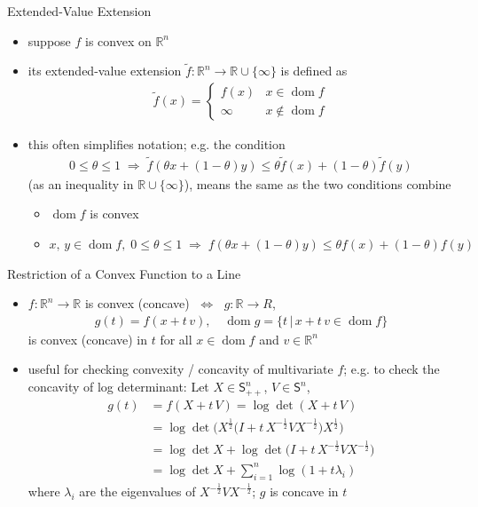 \documentclass[10pt,handout]{beamer}
\newcommand{\ds}{\displaystyle}
\newcommand{\ie}{\;\Longrightarrow\;}
\newcommand{\ifff}{\;\Longleftrightarrow\;}
\DeclareMathOperator*{\dom}{dom}
\theoremstyle{definition}
\begin{document}
\begin{frame}{Extended-Value Extension}
  \begin{itemize}
    \item suppose $f$ is convex on $\mathbb{R}^n$
    \item its extended-value extension $\ds\widetilde{f}: \mathbb{R}^n\to\mathbb{R}\cup\{\infty\}$ is defined as
      \begin{align*}
        \widetilde{f}(x) = \begin{cases}f(x) & x\in\dom f \\ \infty & x\not\in\dom f\end{cases} 
      \end{align*}
    \item this often simplifies notation; e.g. the condition 
      \begin{align*}
        0\leqslant\theta\leqslant 1\ie\widetilde{f}(\theta x + (1 - \theta) y)\leqslant\theta\widetilde{f}(x) + (1 - \theta)\widetilde{f}(y)
      \end{align*}
      (as an inequality in $\mathbb{R}\cup\{\infty\}$), means the same as the two conditions combine
      \begin{itemize}
        \item $\dom f$ is convex
        \item $x,\,y\in\dom f,\;0\leqslant\theta\leqslant 1 \ie f(\theta x + (1 - \theta)y)\leqslant\theta f(x) + (1 - \theta) f(y)$
      \end{itemize}
  \end{itemize}
\end{frame}

\begin{frame}{Restriction of a Convex Function to a Line}
  \begin{itemize}
    \item $f:\mathbb{R}^n\to\mathbb{R}$ is convex (concave) $\ifff$ $g:\mathbb{R}\to R$, 
      \begin{align*}
        g(t) = f(x + t\,v), \quad\dom g = \{t\,|\, x+t\,v\in\dom f\}  
      \end{align*}
      is convex (concave) in $t$ for all $x\in\dom f$ and $v\in\mathbb{R}^n$
    \item useful for checking convexity / concavity of multivariate $f$; e.g. to check the concavity of log determinant: Let $X\in\mathsf{S}^n_{++}$, $V\in\mathsf{S}^n$,
      \begin{align*} 
        g(t) &= f(X + t\,V) = \log\det(X + t\,V) \\
             &= \log\det\big(X^{\frac{1}{2}}\big(I + t\,X^{-\frac{1}{2}}VX^{-\frac{1}{2}}\big)X^{\frac{1}{2}}\big) \\
             &= \log\det X + \log\det\big(I + t\,X^{-\frac{1}{2}}VX^{-\frac{1}{2}}\big) \\
             &= \log\det X + \sum_{i=1}^n\log(1 + t\lambda_i) 
           \end{align*}\vspace{-3em}
      where $\lambda_i$ are the eigenvalues of $\ds X^{-\frac{1}{2}}VX^{-\frac{1}{2}}$; $g$ is concave in $t$
  \end{itemize}
\end{frame}
\end{document}

